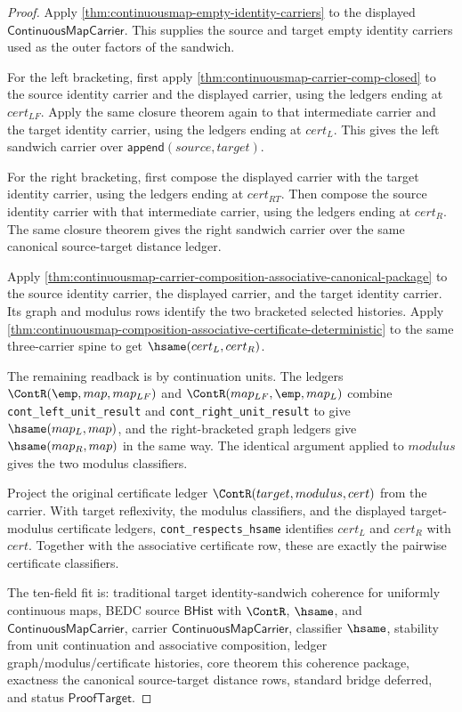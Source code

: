 \begin{proof}
Apply \autoref{thm:continuousmap-empty-identity-carriers} to the displayed
$\mathsf{ContinuousMapCarrier}$. This supplies the source and target empty
identity carriers used as the outer factors of the sandwich.

For the left bracketing, first apply
\autoref{thm:continuousmap-carrier-comp-closed} to the source identity carrier
and the displayed carrier, using the ledgers ending at $cert_{LF}$. Apply the
same closure theorem again to that intermediate carrier and the target identity
carrier, using the ledgers ending at $cert_L$. This gives the left sandwich
carrier over $\mathsf{append}(source,target)$.

For the right bracketing, first compose the displayed carrier with the target
identity carrier, using the ledgers ending at $cert_{RT}$. Then compose the
source identity carrier with that intermediate carrier, using the ledgers ending
at $cert_R$. The same closure theorem gives the right sandwich carrier over the
same canonical source-target distance ledger.

Apply
\autoref{thm:continuousmap-carrier-composition-associative-canonical-package}
to the source identity carrier, the displayed carrier, and the target identity
carrier. Its graph and modulus rows identify the two bracketed selected
histories. Apply
\autoref{thm:continuousmap-composition-associative-certificate-deterministic}
to the same three-carrier spine to get $\hsame(cert_L,cert_R)$.

The remaining readback is by continuation units. The ledgers
$\ContR(\emp,map,map_{LF})$ and $\ContR(map_{LF},\emp,map_L)$ combine
\texttt{cont\_left\_unit\_result} and \texttt{cont\_right\_unit\_result} to
give $\hsame(map_L,map)$, and the right-bracketed graph ledgers give
$\hsame(map_R,map)$ in the same way. The identical argument applied to
$modulus$ gives the two modulus classifiers.

Project the original certificate ledger $\ContR(target,modulus,cert)$ from the
carrier. With target reflexivity, the modulus classifiers, and the displayed
target-modulus certificate ledgers, \texttt{cont\_respects\_hsame} identifies
$cert_L$ and $cert_R$ with $cert$. Together with the associative certificate
row, these are exactly the pairwise certificate classifiers.

The ten-field fit is: traditional target identity-sandwich coherence for
uniformly continuous maps, BEDC source $\mathsf{BHist}$ with $\ContR$, $\hsame$,
and $\mathsf{ContinuousMapCarrier}$, carrier $\mathsf{ContinuousMapCarrier}$,
classifier $\hsame$, stability from unit continuation and associative
composition, ledger graph/modulus/certificate histories, core theorem this
coherence package, exactness the canonical source-target distance rows, standard
bridge deferred, and status $\mathsf{ProofTarget}$.
\end{proof}
